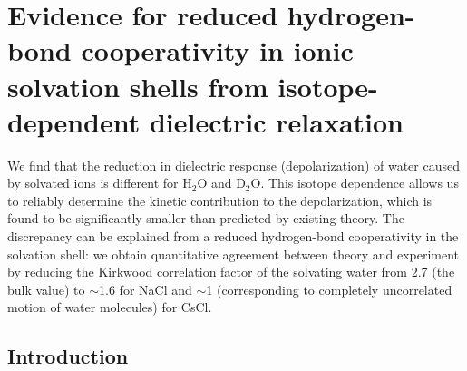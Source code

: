 

\chapter[Reduced hydrogen-bond cooperativity in ionic solvation shells]{Evidence for reduced hydrogen-bond cooperativity in ionic solvation shells from isotope-dependent dielectric relaxation}
\label{ChapterPRL}


\vspace{30pt}

We find that the reduction in dielectric response (depolarization) of water caused by solvated ions is different for H$_2$O and D$_2$O. This isotope dependence allows us to reliably determine the kinetic contribution to the depolarization, which is found to be significantly smaller than predicted by existing theory. The discrepancy can be explained from a reduced hydrogen-bond cooperativity in the solvation shell: we obtain quantitative agreement between theory and experiment by reducing the Kirkwood correlation factor of the solvating water from 2.7 (the bulk value) to $\sim$1.6 for NaCl and $\sim$1 (corresponding to completely uncorrelated motion of water molecules) for CsCl.

\newpage

\section{Introduction}


